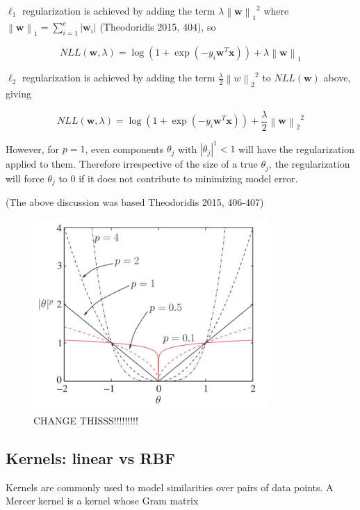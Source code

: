 \documentclass[letterpaper, 12pt]{article}
\newcommand{\norm}[1]{\left\lVert #1 \right\rVert}
\newcommand{\vect}[1]{\boldsymbol{#1}}
\begin{document}
$\ell_1$ regularization is achieved by adding the term $\lambda {\norm{\vect{w}}_1}^2$ where $\norm{\vect{w}}_1 = \sum_{i=1}^{c} |\vect{w}_i|$ (Theodoridis 2015, 404), so

\begin{equation*}
  NLL(\vect{w}, \lambda) = \log(1 + \exp(-y_i \vect{w}^T\vect{x})) + \lambda {\norm{\vect{w}}_1}
\end{equation*}


$\ell_2$ regularization is achieved by adding the term $\frac{\lambda}{2} {\norm{w}_2}^2$ to $NLL(\vect{w})$ above, giving

\begin{equation*}
  NLL(\vect{w}, \lambda) = \log(1 + \exp(-y_i \vect{w}^T\vect{x})) + \frac{\lambda}{2} {\norm{\vect{w}}_2}^2
\end{equation*}

However, for $p = 1$, even components $\theta_j$ with $|\theta_j|^1 < 1$ will have the regularization applied to them. Therefore irrespective of the size of a true $\theta_j$, the regularization will force $\theta_j$ to 0 if it does not contribute to minimizing model error.

(The above discussion was based Theodoridis 2015, 406-407)

\begin{figure}[ht!]
\centering
\includegraphics[width=90mm]{figure1.jpg}
\caption{CHANGE THISSS!!!!!!!!! \label{overflow}}
\end{figure}

\subsection{Kernels: linear vs RBF}

Kernels are commonly used to model similarities over pairs of data points. A Mercer kernel is a kernel whose Gram matrix
\end{document}

